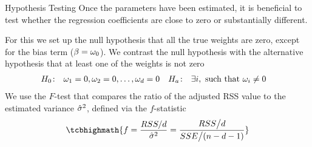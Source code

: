 %
%
\begin{frame}{Hypothesis Testing}
Once the parameters have been estimated, it is beneficial to test
whether the regression coefficients are close to zero or substantially
different. 

\medskip

For this we set up the null hypothesis that all the true weights are
zero, except for the
bias term ($\beta = \omega_0$). 
We contrast the null hypothesis with the alternative hypothesis that at least one
of the weights is not zero
\begin{align*}
	H_0\!: & \quad \omega_1 = 0, \omega_2 = 0, \ldots, \omega_d = 0 & 
    H_a\!: & \quad \exists i, \text{ such that } \omega_i \ne 0
\end{align*}
%
%
We use the $F$-test that compares the ratio of the adjusted RSS value to the
estimated variance $\hat{\sigma}^2$, defined via the $f$-statistic
\begin{align*}
    \tcbhighmath{
    f = \frac{RSS/d}{\hsigma^2} = \frac{RSS\big/d}{SSE\big/(n-d-1)}}
\end{align*}
%

\end{frame}
